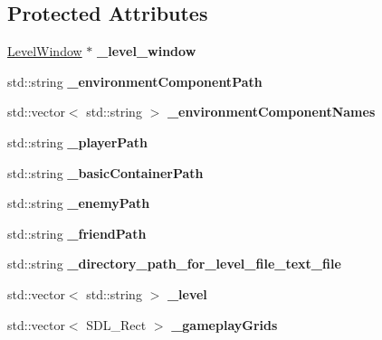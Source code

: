 \subsection*{Protected Attributes}
\begin{DoxyCompactItemize}
\item 
\hypertarget{class_level_aa13108f91760be62ede356de5d672053}{}\label{class_level_aa13108f91760be62ede356de5d672053} 
\hyperlink{class_level_window}{Level\+Window} $\ast$ {\bfseries \+\_\+level\+\_\+window}
\item 
\hypertarget{class_level_aada31895cc425712ed153b27149a4a3e}{}\label{class_level_aada31895cc425712ed153b27149a4a3e} 
std\+::string {\bfseries \+\_\+environment\+Component\+Path}
\item 
\hypertarget{class_level_aea358fcbb8843324015450d6d64c3fca}{}\label{class_level_aea358fcbb8843324015450d6d64c3fca} 
std\+::vector$<$ std\+::string $>$ {\bfseries \+\_\+environment\+Component\+Names}
\item 
\hypertarget{class_level_a8d2f34dc13ca40b4afb67a54dfe8847e}{}\label{class_level_a8d2f34dc13ca40b4afb67a54dfe8847e} 
std\+::string {\bfseries \+\_\+player\+Path}
\item 
\hypertarget{class_level_a2c08183be323a0c31f7d02b93d68e098}{}\label{class_level_a2c08183be323a0c31f7d02b93d68e098} 
std\+::string {\bfseries \+\_\+basic\+Container\+Path}
\item 
\hypertarget{class_level_a78e37613bc65b80bc5cf71dc652b259f}{}\label{class_level_a78e37613bc65b80bc5cf71dc652b259f} 
std\+::string {\bfseries \+\_\+enemy\+Path}
\item 
\hypertarget{class_level_a095367526cda7163a8537009c6811f67}{}\label{class_level_a095367526cda7163a8537009c6811f67} 
std\+::string {\bfseries \+\_\+friend\+Path}
\item 
\hypertarget{class_level_a68a007eb38444afd0536f038f85df306}{}\label{class_level_a68a007eb38444afd0536f038f85df306} 
std\+::string {\bfseries \+\_\+directory\+\_\+path\+\_\+for\+\_\+level\+\_\+file\+\_\+text\+\_\+file}
\item 
\hypertarget{class_level_a78c0252d860e02697e3c417e1ca173c6}{}\label{class_level_a78c0252d860e02697e3c417e1ca173c6} 
std\+::vector$<$ std\+::string $>$ {\bfseries \+\_\+level}
\item 
\hypertarget{class_level_a03f66ffad65acc6c5d46b654f27e7c81}{}\label{class_level_a03f66ffad65acc6c5d46b654f27e7c81} 
std\+::vector$<$ S\+D\+L\+\_\+\+Rect $>$ {\bfseries \+\_\+gameplay\+Grids}
\item 
\hypertarget{class_level_a1af5cc7db2c573b6f14d36f5ba19d609}{}\label{class_level_a1af5cc7db2c573b6f14d36f5ba19d609} 

\end{DoxyCompactItemize}
